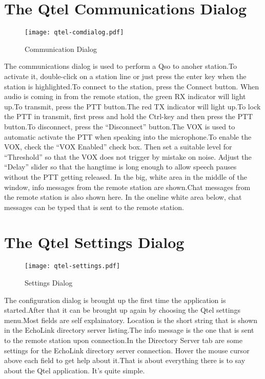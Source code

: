 \documentclass[paper=a4,fontsize=12pt]{scrartcl}
\begin{document}
\section{The Qtel Communications Dialog}
   \begin{figure}[H]
      \centering
      \texttt{[image: qtel-comdialog.pdf]}
      \caption[The Qtel Communications Dialog]{Communication Dialog}
   \end{figure}

   The communications dialog is used to perform a Qso to anoher station.{\kern2.5pt}To activate it, double-click on a station line or just 
   press the enter key when the station is highlighted.{\kern2.5pt}To connect to the station, press the Connect button. When audio is coming 
   in from the remote station, the green RX indicator will light up.{\kern2.5pt}To transmit, press the PTT button.{\kern3pt}The red TX 
   indicator will light up.{\kern2.5pt}To lock the PTT in transmit, first press and hold the Ctrl-key and then press the PTT
   button.{\kern2.5pt}To disconnect, press the ``Disconnect'' button.{\kern3pt}The VOX is used to automatic activate the PTT when speaking
   into the microphone.{\kern2.5pt}To enable the VOX, check the ``VOX Enabled'' check box. Then set a suitable level for ``Threshold'' so 
   that the VOX does not trigger by mistake on noise. Adjust the ``Delay'' slider so that the hangtime is long enough to allow speech pauses 
   without the PTT getting released. In the big, white area in the middle of the window, info messages from the remote station are 
   shown.{\kern3pt}Chat messages from the remote station is also shown here. In the oneline white area below, chat messages can be typed 
   that is sent to the remote station.

\section{The Qtel Settings Dialog}
   \begin{figure}[H]
      \centering
      \texttt{[image: qtel-settings.pdf]}
      \caption[The Qtel Settings Dialog]{Settings Dialog}
   \end{figure}

   The configuration dialog is brought up the first time the application is started.{\kern2pt}After that it can be brought up again by 
   choosing the Qtel settings menu.{\kern3pt}Most fields are self explainatory. Location is the short string that is shown in the EchoLink 
   directory server listing.{\kern3pt}The info message is the one that is sent to the remote station upon connection.{\kern2pt}In the
   Directory Server tab are some settings for the EchoLink directory server connection. Hover the mouse cursor above each field to get help 
   about it.{\kern2.5pt}That is about everything there is to say about the Qtel application. It's quite simple.
\end{document}

